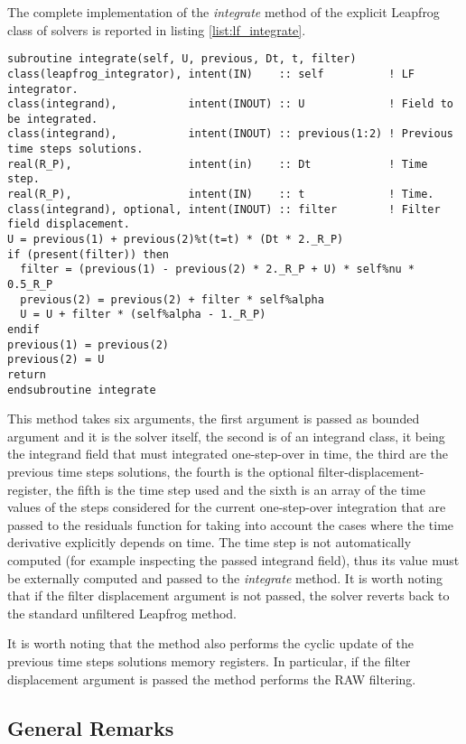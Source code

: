 The complete implementation of the \emph{integrate} method of the explicit Leapfrog class of solvers is reported in listing \ref{list:lf_integrate}.

\begin{lstlisting}[firstnumber=1,style=code,caption={implementation of the \emph{integrate} method of explicit Leapfrog class},label={list:lf_integrate}]
subroutine integrate(self, U, previous, Dt, t, filter)
class(leapfrog_integrator), intent(IN)    :: self          ! LF integrator.
class(integrand),           intent(INOUT) :: U             ! Field to be integrated.
class(integrand),           intent(INOUT) :: previous(1:2) ! Previous time steps solutions.
real(R_P),                  intent(in)    :: Dt            ! Time step.
real(R_P),                  intent(IN)    :: t             ! Time.
class(integrand), optional, intent(INOUT) :: filter        ! Filter field displacement.
U = previous(1) + previous(2)%t(t=t) * (Dt * 2._R_P)
if (present(filter)) then
  filter = (previous(1) - previous(2) * 2._R_P + U) * self%nu * 0.5_R_P
  previous(2) = previous(2) + filter * self%alpha
  U = U + filter * (self%alpha - 1._R_P)
endif
previous(1) = previous(2)
previous(2) = U
return
endsubroutine integrate
\end{lstlisting}

This method takes six arguments, the first argument is passed as bounded argument and it is the solver itself, the second is of an integrand class, it being the integrand field that must integrated one-step-over in time, the third are the previous time steps solutions, the fourth is the optional filter-displacement-register, the fifth is the time step used and the sixth is an array of the time values of the steps considered for the current one-step-over integration that are passed to the residuals function for taking into account the cases where the time derivative explicitly depends on time. The time step is not automatically computed (for example inspecting the passed integrand field), thus its value must be externally computed and passed to the \emph{integrate} method. It is worth noting that if the filter displacement argument is not passed, the solver reverts back to the standard unfiltered Leapfrog method.

It is worth noting that the method also performs the cyclic update of the previous time steps solutions memory registers. In particular, if the filter displacement argument is passed the method performs the RAW filtering.

\subsection{General Remarks}\label{subsec:API-remarks}

